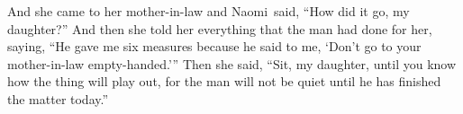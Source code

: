 \begin{inparaenum}
   And she came to her mother-in-law and Naomi\understood\ said, ``How did it go, my daughter?'' And then she told her everything that the man had done for her,%
   saying, ``He gave me six measures because he said to me, `Don't go to your mother-in-law empty-handed.'\thinspace''%
   Then she said, ``Sit, my daughter, until you know how the thing will play out, for the man will not be quiet until he has finished the matter today.''%
\end{inparaenum}
